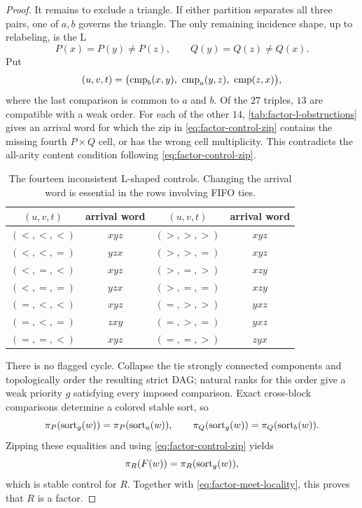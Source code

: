 \begin{proof}
It remains to exclude a triangle.  If either partition separates all three
pairs, one of \(a,b\) governs the triangle.  The only remaining incidence
shape, up to relabeling, is the L
\begin{equation}
 P(x)=P(y)\ne P(z),
 \qquad
 Q(y)=Q(z)\ne Q(x).
 \label{eq:factor-l-shape}
\end{equation}
Put
\begin{equation}
 (u,v,t)=
 \bigl(\operatorname{cmp}_b(x,y),\ \operatorname{cmp}_a(y,z),\ \operatorname{cmp}(z,x)\bigr),
 \label{eq:factor-l-comparisons}
\end{equation}
where the last comparison is common to \(a\) and \(b\).  Of the \(27\)
triples, \(13\) are compatible with a weak order.  For each of the other
\(14\), \autoref{tab:factor-l-obstructions} gives an arrival word for which the
zip in \autoref{eq:factor-control-zip} contains the missing fourth
\(P\times Q\) cell, or has the wrong cell multiplicity.  This contradicts the
all-arity content condition following \autoref{eq:factor-control-zip}.

\begin{table}[H]
\centering
\small
\begin{tabular}{@{}cc@{\qquad\qquad}cc@{}}
\toprule
\((u,v,t)\) & arrival word & \((u,v,t)\) & arrival word\\
\midrule
\((<,<,<)\) & \(xyz\) & \((>,>,>)\) & \(xyz\)\\
\((<,<,=)\) & \(yzx\) & \((>,>,=)\) & \(xyz\)\\
\((<,=,<)\) & \(xyz\) & \((>,=,>)\) & \(xzy\)\\
\((<,=,=)\) & \(yzx\) & \((>,=,=)\) & \(xzy\)\\
\((=,<,<)\) & \(xyz\) & \((=,>,>)\) & \(yxz\)\\
\((=,<,=)\) & \(zxy\) & \((=,>,=)\) & \(yxz\)\\
\((=,=,<)\) & \(xyz\) & \((=,=,>)\) & \(zyx\)\\
\bottomrule
\end{tabular}
\caption{The fourteen inconsistent L-shaped controls.  Changing the arrival
word is essential in the rows involving FIFO ties.}
\label{tab:factor-l-obstructions}
\end{table}

There is no flagged cycle.  Collapse the tie strongly connected components
and topologically order the resulting strict DAG; natural ranks for this order
give a weak priority \(g\) satisfying every imposed comparison.  Exact
cross-block comparisons determine a colored stable sort, so
\begin{equation}
 \pi_{P}(\operatorname{sort}_g(w))=\pi_{P}(\operatorname{sort}_a(w)),
 \qquad
 \pi_{Q}(\operatorname{sort}_g(w))=\pi_{Q}(\operatorname{sort}_b(w)).
 \label{eq:factor-amalgamated-controls}
\end{equation}
Zipping these equalities and using \autoref{eq:factor-control-zip} yields
\[
  \pi_{R}(F(w))=\pi_{R}(\operatorname{sort}_g(w)),
\]
which is stable control for \(R\).  Together with
\autoref{eq:factor-meet-locality}, this proves that \(R\) is a factor.
\end{proof}

